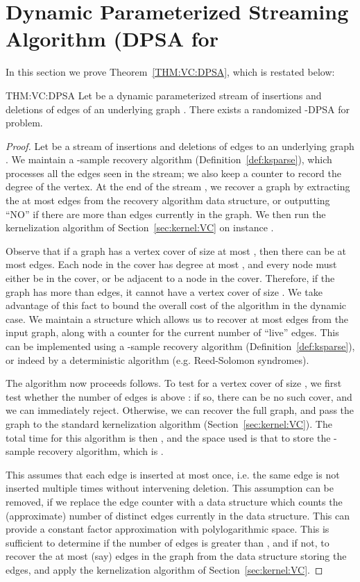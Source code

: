 \documentclass[11pt,letter]{article}
\begin{document}
\section{Dynamic Parameterized Streaming Algorithm (DPSA for  }
\label{app:vc:dpsa}

In this section we prove Theorem~\ref{THM:VC:DPSA}, which is restated below:

\begin{reptheorem}{THM:VC:DPSA}
Let  be a dynamic parameterized stream of  insertions and deletions of edges of an underlying graph .
There exists a randomized -DPSA for  problem.
\end{reptheorem}
\begin{proof}
Let  be a stream of insertions and deletions of edges to an
underlying graph .
We maintain a
-sample recovery algorithm (Definition~\ref{def:ksparse}), which
processes all the edges seen in the stream; we also keep a counter
to record the degree of the vertex.
At the end of the stream , we recover a graph  by extracting
the at most  edges from the recovery algorithm data structure, or
outputting ``NO'' if there are more than  edges currently in the
graph.
We then run the kernelization algorithm of Section~\ref{sec:kernel:VC}
on instance .

Observe that if a graph has a vertex cover of
size at most , then there can be at most  edges.
Each node in the cover has degree at most , and every node must
either be in the cover, or be adjacent to a node in the cover.
Therefore, if the graph has more than  edges, it cannot have a
vertex cover of size .
We take advantage of this fact to bound the overall cost of the
algorithm in the dynamic case.
We maintain a structure which allows us to recover at most  edges
from the input graph, along with a counter for the current number of
``live'' edges.
This can be implemented using a -sample recovery algorithm
(Definition~\ref{def:ksparse}), or indeed by a deterministic algorithm
(e.g. Reed-Solomon syndromes).

The algorithm now proceeds follows.
To test for a vertex cover of size , we first test whether the
number of edges is above : if so, there can be no such cover, and
we can immediately reject.
Otherwise, we can recover the full graph, and pass the graph to the
standard kernelization algorithm (Section~\ref{sec:kernel:VC}).
The total time for this algorithm is then , and the
space used is that to store the -sample recovery algorithm, which
is .

This assumes that each edge is inserted at most once, i.e. the same
edge is not inserted multiple times without intervening deletion.
This assumption can be removed, if we replace the edge counter with a
data structure which counts the (approximate) number of distinct edges
currently in the data structure.
This can provide a constant factor approximation with polylogarithmic
space.
This is sufficient to determine if the number of edges is greater than
, and if not, to recover the at most (say)  edges in
the graph from the data structure storing the edges, and apply the kernelization algorithm of Section~\ref{sec:kernel:VC}.
\end{proof}
\end{document}
